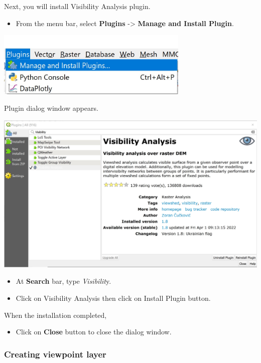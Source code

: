 \documentclass[
  letterpaper,
  DIV=11,
  numbers=noendperiod]{scrreprt}
\providecommand{\tightlist}{%
  \setlength{\itemsep}{0pt}\setlength{\parskip}{0pt}}\usepackage{longtable,booktabs,array}
\begin{document}
Next, you will install Visibility Analysis plugin.

\begin{itemize}
\tightlist
\item
  From the menu bar, select \textbf{Plugins} -\textgreater{}
  \textbf{Manage and Install Plugin}.
\end{itemize}

\includegraphics[width=3.61458in,height=\textheight]{./img06/image55.jpg}

Plugin dialog window appears.

\includegraphics{./img06/image56.jpg}

\begin{itemize}
\item
  At \textbf{Search} bar, type \emph{Visibilit}y.
\item
  Click on Visibility Analysis then click on Install Plugin button.
\end{itemize}

When the installation completed,

\begin{itemize}
\tightlist
\item
  Click on \textbf{Close} button to close the dialog window.
\end{itemize}

\hypertarget{creating-viewpoint-layer}{%
\subsubsection{Creating viewpoint
layer}\label{creating-viewpoint-layer}}
\end{document}

